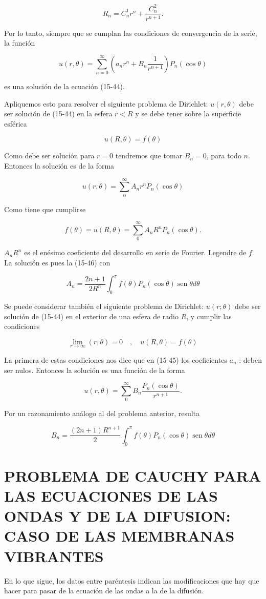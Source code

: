 \documentclass[10pt]{article}
\theoremstyle{plain}
\theoremstyle{definition}
\theoremstyle{remark}
\begin{document}
$$
R_{n}=C_{n}^{1} r^{n}+\frac{C_{n}^{2}}{r^{n+1}} .
$$

Por lo tanto, siempre que se cumplan las condiciones de convergencia de la serie, la función


\begin{equation*}
u(r, \theta)=\sum_{n=0}^{\infty}\left(a_{n} r^{n}+B_{n} \frac{1}{r^{n+1}}\right) P_{n}(\cos \theta) \tag{15-45}
\end{equation*}


es una solución de la ecuación (15-44).

Apliquemos esto para resolver el siguiente problema de Dirichlet: $u(r, \theta)$ debe ser solución de (15-44) en la esfera $r<R$ y se debe tener sobre la superficie esférica

$$
u(R, \theta)=f(\theta)
$$

Como debe ser solución para $r=0$ tendremos que tomar $B_{n}=0$, para todo $n$. Entonces la solución es de la forma

$$
u(r, \theta)=\sum_{0}^{\infty} A_{n} r^{n} P_{n}(\cos \theta)
$$

Como tiene que cumplirse


$$
f(\theta)=u(R, \theta)=\sum_{0}^{\infty} A_{n} R^{n} P_{n}(\cos \theta) .
$$

$A_{n} R^{n}$ es el enésimo coeficiente del desarrollo en serie de Fourier. Legendre de $f$. La solución es pues la (15-46) con

$$
A_{n}=\frac{2 n+1}{2 R^{n}} \int_{0}^{\pi} f(\theta) P_{n}(\cos \theta) \operatorname{sen} \theta d \theta
$$

Se puede considerar también el siguiente problema de Dirichlet: $u(r ; \theta)$ debe ser solución de (15-44) en el exterior de una esfera de radio $R$, y cumplir las condiciones

$$
\lim _{r \rightarrow \infty}(r, \theta)=0 \quad, \quad u(R, \theta)=f(\theta)
$$

La primera de estas condiciones nos dice que en (15-45) los coeficientes $a_{n}$ : deben ser nulos. Entonces la solución es una función de la forma

$$
u(r, \theta)=\sum_{0}^{\infty} B_{n} \frac{P_{n}(\cos \theta)}{r^{n+1}} .
$$

Por un razonamiento análogo al del problema anterior, resulta

$$
B_{n}=\frac{(2 n+1) R^{n+1}}{2} \int_{0}^{\pi} f(\theta) P_{n}(\cos \theta) \operatorname{sen} \theta d \theta
$$

\section*{PROBLEMA DE CAUCHY PARA LAS ECUACIONES DE LAS ONDAS Y DE LA DIFUSION: CASO DE LAS MEMBRANAS VIBRANTES}
En lo que sigue, los datos entre paréntesis indican las modificaciones que hay que hacer para pasar de la ecuación de las ondas a la de la difusión.
\end{document}
